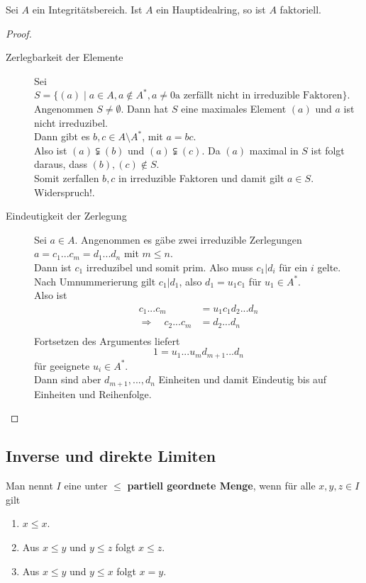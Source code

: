 	\begin{theorem}
		Sei $A$ ein Integritätsbereich. Ist $A$ ein Hauptidealring, so ist $A$ faktoriell.
	\end{theorem}
	\begin{proof}
		\begin{description}
			\item[Zerlegbarkeit der Elemente] Sei $S=\{(a)\mid a\in A,a\notin A^*,a\neq 0\text{a zerfällt nicht in irreduzible Faktoren}\}$.\\
			Angenommen $S\neq\emptyset$. Dann hat $S$ eine maximales Element $(a)$ und $a$ ist nicht irreduzibel.\\
			Dann gibt es $b,c\in A\setminus A^*$, mit $a=bc$.\\
			Also ist $(a)\subsetneqq (b)$ und $(a)\subsetneqq (c)$. Da $(a)$ maximal in $S$ ist folgt daraus, dass $(b),(c)\notin S$.\\
			Somit zerfallen $b,c$ in irreduzible Faktoren und damit gilt $a\in S$. Widerspruch!.
			\item[Eindeutigkeit der Zerlegung] Sei $a\in A$. Angenommen es gäbe zwei irreduzible Zerlegungen $a=c_1...c_m=d_1...d_n$ mit $m\leq n$.\\
			Dann ist $c_1$ irreduzibel und somit prim. Also muss $c_1|d_i$ für ein $i$ gelte.\\
			Nach Umnummerierung gilt $c_1|d_1$, also $d_1=u_1c_1$ für $u_1\in A^*$.\\
			Also ist
			\begin{align*}
			c_1...c_m&=u_1c_1d_2...d_n\\
			\Rightarrow\quad c_2...c_m&=d_2...d_n\\
			\end{align*}
			Fortsetzen des Argumentes liefert
			\[1=u_1...u_md_{m+1}...d_n\]
			für geeignete $u_i\in A^*$.\\
			Dann sind aber $d_{m+1},...,d_n$ Einheiten und damit Eindeutig bis auf Einheiten und Reihenfolge.
		\end{description}
	\end{proof}

\subsection{Inverse und direkte Limiten}

	\begin{definition}
		Man nennt $I$ eine unter $\leq$ \textbf{partiell geordnete Menge}, wenn für alle $x,y,z\in I$ gilt
		\begin{enumerate}
			\item $x\leq x$.
			\item Aus $x\leq y$ und $y\leq z$ folgt $x\leq z$.
			\item Aus $x\leq y$ und $y\leq x$ folgt $x=y$.
		\end{enumerate}
	\end{definition}

